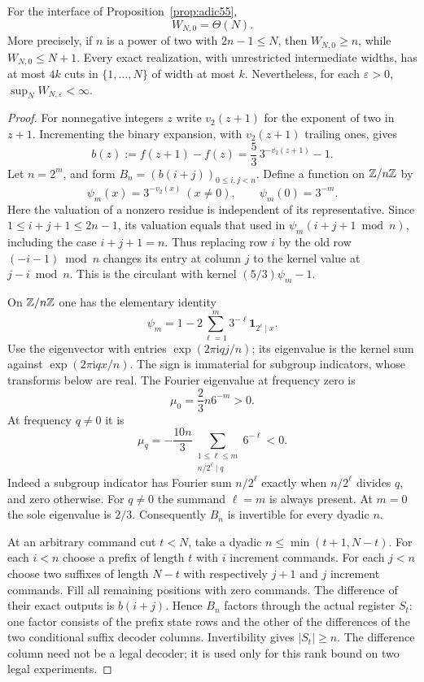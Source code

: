 \begin{theorem}\label{thm:adiclinear55}
For the interface of Proposition~\ref{prop:adic55},
\[
                         W_{N,0}=\Theta(N).
\]
More precisely, if $n$ is a power of two with $2n-1\le N$, then $W_{N,0}\ge n$, while $W_{N,0}\le N+1$. Every exact realization, with unrestricted intermediate widths, has at most $4k$ cuts in $\{1,\ldots,N\}$ of width at most $k$. Nevertheless, for each $\varepsilon>0$, $\sup_NW_{N,\varepsilon}<\infty$.
\end{theorem}
\begin{proof}
For nonnegative integers $z$ write $v_2(z+1)$ for the exponent of two in $z+1$. Incrementing the binary expansion, with $v_2(z+1)$ trailing ones, gives
\begin{equation}\label{eq:adicdifference55}
 b(z):=f(z+1)-f(z)=\frac53\,3^{-v_2(z+1)}-1.
\end{equation}
Let $n=2^m$, and form $B_n=(b(i+j))_{0\le i,j<n}$. Define a function on $\mathbb Z/n\mathbb Z$ by
\[
 \psi_m(x)=3^{-v_2(x)}\ (x\ne0),\qquad \psi_m(0)=3^{-m}.
\]
Here the valuation of a nonzero residue is independent of its representative. Since $1\le i+j+1\le2n-1$, its valuation equals that used in $\psi_m(i+j+1\bmod n)$, including the case $i+j+1=n$. Thus replacing row $i$ by the old row $(-i-1)\bmod n$ changes its entry at column $j$ to the kernel value at $j-i\bmod n$. This is the circulant with kernel $(5/3)\psi_m-1$.

On $\mathbb Z/n\mathbb Z$ one has the elementary identity
\[
            \psi_m=1-2\sum_{\ell=1}^m3^{-\ell}
                               \mathbf1_{2^\ell\mid x}.
\]
Use the eigenvector with entries $\exp(2\pi \mathrm i qj/n)$; its eigenvalue is the kernel sum against $\exp(2\pi \mathrm i qx/n)$. The sign is immaterial for subgroup indicators, whose transforms below are real. The Fourier eigenvalue at frequency zero is
\[
 \mu_0=\frac23 n6^{-m}>0.
\]
At frequency $q\ne0$ it is
\[
 \mu_q=-\frac{10n}{3}
           \sum_{\substack{1\le\ell\le m\\ n/2^\ell\mid q}}6^{-\ell}<0.
\]
Indeed a subgroup indicator has Fourier sum $n/2^\ell$ exactly when $n/2^\ell$ divides $q$, and zero otherwise. For $q\ne0$ the summand $\ell=m$ is always present. At $m=0$ the sole eigenvalue is $2/3$. Consequently $B_n$ is invertible for every dyadic $n$.

At an arbitrary command cut $t<N$, take a dyadic $n\le\min(t+1,N-t)$. For each $i<n$ choose a prefix of length $t$ with $i$ increment commands. For each $j<n$ choose two suffixes of length $N-t$ with respectively $j+1$ and $j$ increment commands. Fill all remaining positions with zero commands. The difference of their exact outputs is $b(i+j)$. Hence $B_n$ factors through the actual register $S_t$: one factor consists of the prefix state rows and the other of the differences of the two conditional suffix decoder columns. Invertibility gives $|S_t|\ge n$. The difference column need not be a legal decoder; it is used only for this rank bound on two legal experiments.


\end{proof}
